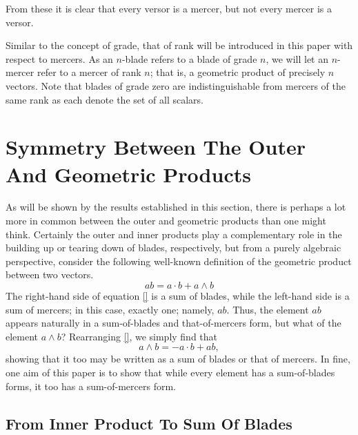 \documentclass{birkjour}
\theoremstyle{definition}
\theoremstyle{remark}
\numberwithin{equation}{section}
\begin{document}
From these it is clear that every versor is a mercer, but not every mercer is a versor.

Similar to the concept of grade, that of rank will be introduced in this paper with respect to mercers.  As an $n$-blade
refers to a blade of grade $n$, we will let an $n$-mercer refer to a mercer of rank $n$; that is, a geometric
product of precisely $n$ vectors.  Note that blades of grade zero
are indistinguishable from mercers of the same rank as each denote the set of all scalars.

\section{Symmetry Between The Outer And Geometric Products}

As will be shown by the results established in this section, there is perhaps a lot more in
common between the outer and geometric products than one might think.  Certainly the outer and
inner products play a complementary role in the building up or tearing down of blades, respectively, but from a
purely algebraic perspective, consider the following well-known definition of the geometric product
between two vectors.
\begin{equation}
ab = a\cdot b + a\wedge b
\end{equation}
The right-hand side of equation \eqref{} is a sum of blades, while the left-hand side is a sum of mercers;
in this case, exactly one; namely, $ab$.  Thus, the element $ab$ appears naturally in a sum-of-blades and
that-of-mercers form, but what of the element $a\wedge b$?  Rearranging \eqref{}, we simply find that
\begin{equation}
a\wedge b = -a\cdot b + ab,
\end{equation}
showing that it too may be written as a sum of blades or that of mercers.  In fine, one aim of this paper
is to show that while every element has a sum-of-blades forms, it too has a sum-of-mercers form.

\subsection{From Inner Product To Sum Of Blades}
\end{document}

